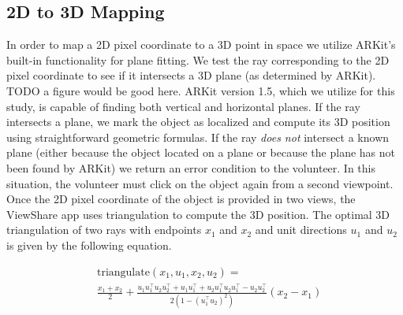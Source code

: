 \documentclass[chi_draft]{sigchi}
\begin{document}
\subsection{2D to 3D Mapping}
In order to map a 2D pixel coordinate to a 3D point in space we utilize ARKit's built-in functionality for plane fitting.  We test the ray corresponding to the 2D pixel coordinate to see if it intersects a 3D plane (as determined by ARKit).  TODO a figure would be good here.  ARKit version 1.5, which we utilize for this study, is capable of finding both vertical and horizontal planes.  If the ray intersects a plane, we mark the object as localized and compute its 3D position using straightforward geometric formulas.  If the ray \emph{does not} intersect a known plane (either because the object located on a plane or because the plane has not been found by ARKit) we return an error condition to the volunteer.  In this situation, the volunteer must click on the object again from a second viewpoint.  Once the 2D pixel coordinate of the object is provided in two views, the ViewShare app uses triangulation to compute the 3D position.  The optimal 3D triangulation of two rays with endpoints $x_1$ and $x_2$ and unit directions $u_1$ and $u_2$ is given by the following equation.

\begin{align}
&\mbox{triangulate}(x_1, u_1, x_2, u_2) \nonumber = \\
&\frac{x_1 + x_2}{2}  + \frac{ u_1 u_1^\top u_2 u_2^\top  +  u_1 u_1^\top  + u_2 u_1^\top  u_2 u_1^\top - u_2 u_2^\top }{2 \left (1 -  \left ( u_1^\top u_2 \right)^2\right) } \left(  x_2 - x_1\right) \nonumber
\end{align}


%
\end{document}
